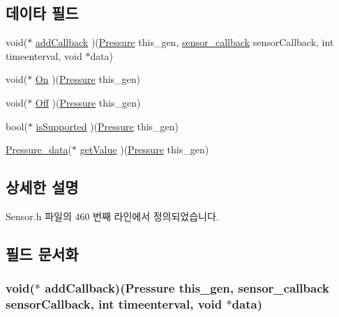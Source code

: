 \subsection*{데이타 필드}
\begin{DoxyCompactItemize}
\item 
void($\ast$ \hyperlink{struct___pressure_ac3f91ac03d8998c52bcc571a0c88f865}{add\-Callback} )(\hyperlink{_sensor_8h_a2365e53ab6f346814862c92c2c207e7a}{Pressure} this\-\_\-gen, \hyperlink{_sensor_8h_ad8114207845fc5e0aa30832f0c718cd6}{sensor\-\_\-callback} sensor\-Callback, int timeenterval, void $\ast$data)
\item 
void($\ast$ \hyperlink{struct___pressure_a0488fe48cd57a659686387d613cb257c}{On} )(\hyperlink{_sensor_8h_a2365e53ab6f346814862c92c2c207e7a}{Pressure} this\-\_\-gen)
\item 
void($\ast$ \hyperlink{struct___pressure_adf5840cfc7760f9f71bcbffceef22fa5}{Off} )(\hyperlink{_sensor_8h_a2365e53ab6f346814862c92c2c207e7a}{Pressure} this\-\_\-gen)
\item 
bool($\ast$ \hyperlink{struct___pressure_af2099f6f9efc1f7213acfd420ea7b8c6}{is\-Supported} )(\hyperlink{_sensor_8h_a2365e53ab6f346814862c92c2c207e7a}{Pressure} this\-\_\-gen)
\item 
\hyperlink{_sensor_8h_aa9f86b0945dd3aa53269e0a120cce2b0}{Pressure\-\_\-data}($\ast$ \hyperlink{struct___pressure_a9739a7d1b596639f720e0fbb2dd8f064}{get\-Value} )(\hyperlink{_sensor_8h_a2365e53ab6f346814862c92c2c207e7a}{Pressure} this\-\_\-gen)
\end{DoxyCompactItemize}


\subsection{상세한 설명}


Sensor.\-h 파일의 460 번째 라인에서 정의되었습니다.



\subsection{필드 문서화}
\hypertarget{struct___pressure_ac3f91ac03d8998c52bcc571a0c88f865}{
\subsubsection[{add\-Callback}]{\setlength{\rightskip}{0pt plus 5cm}void($\ast$  add\-Callback)({\bf Pressure} this\-\_\-gen, {\bf sensor\-\_\-callback} sensor\-Callback, int timeenterval, void $\ast$data)}}\label{struct___pressure_ac3f91ac03d8998c52bcc571a0c88f865}


